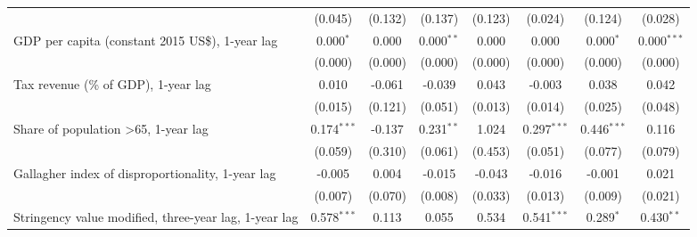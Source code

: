 \begin{table}[htbp]
\begin{tabular}{lccccccc}
                                                                                                  & (0.045)       & (0.132)                   & (0.137)        & (0.123)          & (0.024)         & (0.124)         & (0.028)\\   
      GDP per capita (constant 2015 US\$), 1-year lag                                             & 0.000$^{*}$   & 0.000                     & 0.000$^{**}$   & 0.000            & 0.000           & 0.000$^{*}$     & 0.000$^{***}$\\   
                                                                                                  & (0.000)       & (0.000)                   & (0.000)        & (0.000)          & (0.000)         & (0.000)         & (0.000)\\   
      Tax revenue (\% of GDP), 1-year lag                                                         & 0.010         & -0.061                    & -0.039         & 0.043            & -0.003          & 0.038           & 0.042\\   
                                                                                                  & (0.015)       & (0.121)                   & (0.051)        & (0.013)          & (0.014)         & (0.025)         & (0.048)\\   
      Share of population >65, 1-year lag                                                         & 0.174$^{***}$ & -0.137                    & 0.231$^{**}$   & 1.024            & 0.297$^{***}$   & 0.446$^{***}$   & 0.116\\   
                                                                                                  & (0.059)       & (0.310)                   & (0.061)        & (0.453)          & (0.051)         & (0.077)         & (0.079)\\   
      Gallagher index of disproportionality, 1-year lag                                           & -0.005        & 0.004                     & -0.015         & -0.043           & -0.016          & -0.001          & 0.021\\   
                                                                                                  & (0.007)       & (0.070)                   & (0.008)        & (0.033)          & (0.013)         & (0.009)         & (0.021)\\   
      Stringency value modified, three-year lag, 1-year lag                                       & 0.578$^{***}$ & 0.113                     & 0.055          & 0.534            & 0.541$^{***}$   & 0.289$^{*}$     & 0.430$^{**}$\\   

\end{tabular}
\end{table}
